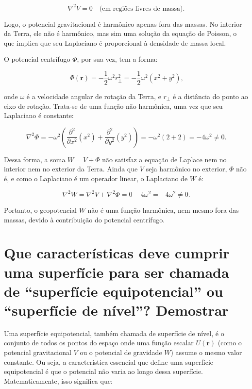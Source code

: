 \[
\nabla^2 V = 0 \quad \text{(em regiões livres de massa).}
\]

\noindent
Logo, o potencial gravitacional é harmônico apenas fora das massas. No interior da Terra, ele não é harmônico, mas sim uma solução da equação de Poisson, o que implica que seu Laplaciano é proporcional à densidade de massa local.

O potencial centrífugo \( \Phi \), por sua vez, tem a forma:

\[
\Phi(\mathbf{r}) = -\frac{1}{2} \omega^2 r_\perp^2 = -\frac{1}{2} \omega^2 (x^2 + y^2) \text{,}
\]

\noindent
onde \( \omega \) é a velocidade angular de rotação da Terra, e \( r_\perp \) é a distância do ponto ao eixo de rotação. Trata-se de uma função não harmônica, uma vez que seu Laplaciano é constante:

\[
\nabla^2 \Phi = -\omega^2 \left( \frac{\partial^2}{\partial x^2} (x^2) + \frac{\partial^2}{\partial y^2} (y^2) \right) = -\omega^2 (2 + 2) = -4\omega^2 \neq 0 \text{.}
\]

Dessa forma, a soma \( W = V + \Phi \) não satisfaz a equação de Laplace nem no interior nem no exterior da Terra. Ainda que \( V \) seja harmônico no exterior, \( \Phi \) não é, e como o Laplaciano é um operador linear, o Laplaciano de \( W \) é:

\[
\nabla^2 W = \nabla^2 V + \nabla^2 \Phi = 0 - 4\omega^2 = -4\omega^2 \neq 0 \text{.}
\]

\noindent
Portanto, o geopotencial \( W \) não é uma função harmônica, nem mesmo fora das massas, devido à contribuição do potencial centrífugo.


\section{Que características deve cumprir uma superfície para ser chamada de “superfície equipotencial” ou “superfície de nível”? Demostrar}

Uma superfície equipotencial, também chamada de superfície de nível, é o conjunto de todos os pontos do espaço onde uma função escalar \( U(\mathbf{r}) \)  (como o potencial gravitacional \( V \) ou o potencial de gravidade \( W \)) assume o mesmo valor constante. Ou seja, a característica essencial que define uma superfície equipotencial é que o potencial não varia ao longo dessa superfície. Matematicamente, isso significa que:

